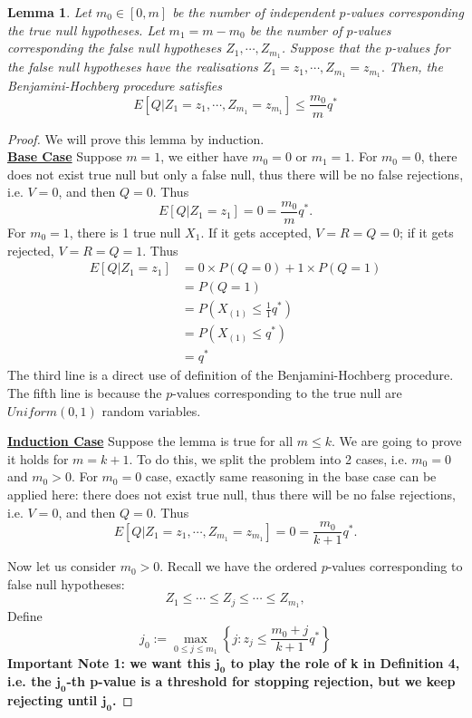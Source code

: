 \documentclass[12pt]{article}
\theoremstyle{plain}
\newtheorem{lemma}{Lemma}
\theoremstyle{definition}
\theoremstyle{remark}
\begin{document}
\begin{lemma}\cite{5.3}\cite{5.7}
Let $m_0\in[0,m]$ be the number of independent $p$-values corresponding the true null hypotheses. Let $m_1=m-m_0$ be the number of $p$-values corresponding the false null hypotheses $Z_1,\cdots,Z_{m_1}$. Suppose that the $p$-values for the false null hypotheses have the realisations $Z_1=z_1,\cdots,Z_{m_1}=z_{m_1}.$
Then, the Benjamini-Hochberg procedure satisfies\[
E[Q|Z_1=z_1,\cdots,Z_{m_1}=z_{m_1}]\leq \frac{m_0}{m}q^*
\]
\end{lemma}

\begin{proof} \cite{5.3} We will prove this lemma by induction.\\
\underline{\textbf{Base Case}}\; Suppose $m=1$, we either have $m_0=0$ or $m_1=1$. For $m_0=0$, there does not exist true null but only a false null, thus there will be no false rejections, i.e. $V=0$, and then $Q=0$. Thus $$E[Q|Z_1=z_1]=0=\frac{m_0}{m}q^*.$$
For $m_0=1$, there is 1 true null $X_1$. If it gets accepted, $V=R=Q=0$; if it gets rejected, $V=R=Q=1$. Thus
\begin{align*}
    E[Q|Z_1=z_1]&=0\times P(Q=0)+1\times P(Q=1)\\
    &=P(Q=1)\\
    &=P(X_{(1)}\leq \frac{1}{1}q^*)\\
    &=P(X_{(1)}\leq q^*)\\
    &=q^*
\end{align*}
The third line is a direct use of definition of the Benjamini-Hochberg procedure. The fifth line is because the $p$-values corresponding to the true null are $Uniform(0,1)$ random variables.

\underline{\textbf{Induction Case}}\; Suppose the lemma is true for all $m\leq k$. We are going to prove it holds for $m=k+1$. To do this, we split the problem into 2 cases, i.e. $m_0=0$ and $m_0>0$. For $m_0=0$ case, exactly same reasoning in the base case can be applied here: there does not exist true null, thus there will be no false rejections, i.e. $V=0$, and then $Q=0$. Thus $$E[Q|Z_1=z_1,\cdots,Z_{m_1}=z_{m_1}]=0=\frac{m_0}{k+1}q^*.$$

Now let us consider $m_0>0$. Recall we have the ordered $p$-values corresponding to false null hypotheses: 
$$Z_1\leq \cdots\leq Z_j\leq \cdots\leq Z_{m_1},$$ 
Define \[
j_0:=\max_{0\leq j\leq m_1}\left\{j:z_j\leq
\frac{m_0+j}{k+1}q^*\right\}
\]
\textbf{Important Note 1: we want this $\mathbf{j_0}$ to play the role of k in Definition 4, i.e. the $\mathbf{j_0}$-th p-value is a threshold for stopping rejection, but we keep rejecting until $\mathbf{j_0}$.}


\end{proof}
\end{document}
